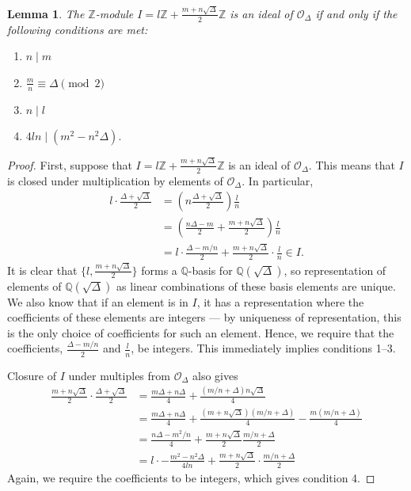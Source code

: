 \documentclass[honours,12pt]{unswthesis}
\newcommand{\Z}{\mathbb{Z}} %
\newcommand{\Q}{\mathbb{Q}} %
\newcommand{\order}{\mathcal{O}} %
\newcommand{\divides}{\mathrel{|}}
\newtheorem{lemma}[theorem]{Lemma}
\numberwithin{equation}{section}
\begin{document}
\vspace{2mm}
\begin{lemma}\label{lemma-lattice-divisibility-conditions}
    The $\Z$-module
    $I = l\Z + \frac{m + n\sqrt\Delta}{2}\Z$
    is an ideal of $\order_\Delta$ if and only if the following conditions are met:
    \begin{enumerate}
        \item $n \divides m$
        \item $\frac{m}{n} \equiv \Delta \pmod{2}$
        \item $n \divides l$
        \item $4ln \divides (m^2 - n^2\Delta).$
    \end{enumerate}
\end{lemma}

\begin{proof}
    First, suppose that $I = l\Z + \frac{m + n\sqrt\Delta}{2} \Z$ is an ideal of $\order_\Delta$.
    This means that $I$ is closed under multiplication by elements of $\order_\Delta$.
    In particular,
    \begin{align*}
        l \cdot \frac{\Delta + \sqrt\Delta}{2} &= \left( n\frac{\Delta + \sqrt\Delta}{2} \right) \frac{l}{n} \\
        &= \left( \frac{n\Delta - m}{2} + \frac{m + n\sqrt\Delta}{2} \right) \frac{l}{n} \\
        &= l \cdot \frac{\Delta - m/n}{2} + \frac{m + n\sqrt\Delta}{2} \cdot \frac{l}{n} \in I.
    \end{align*}
    It is clear that $\{l, \frac{m + n\sqrt\Delta}{2} \}$ forms a $\Q$-basis for $\Q(\sqrt\Delta)$, so representation of elements of $\Q(\sqrt\Delta)$ as linear combinations of these basis elements are unique.
    We also know that if an element is in $I$, it has a representation where the coefficients of these elements are integers --- by uniqueness of representation, this is the only choice of coefficients for such an element.
    Hence, we require that the coefficients, $\frac{\Delta - m/n}{2}$ and $\frac{l}{n}$, be integers.
    This immediately implies conditions 1--3.

    Closure of $I$ under multiples from $\order_\Delta$ also gives
    \begin{align*}
        \frac{m + n\sqrt\Delta}{2} \cdot \frac{\Delta + \sqrt\Delta}{2}
        &= \frac{m\Delta + n\Delta}{4} + \frac{(m/n + \Delta)n\sqrt\Delta}{4} \\
        &= \frac{m\Delta + n\Delta}{4} + \frac{(m + n\sqrt\Delta)(m/n + \Delta)}{4} - \frac{m(m/n + \Delta)}{4} \\
        &= \frac{n\Delta - m^2/n}{4} + \frac{m + n\sqrt\Delta}{2} \frac{m/n + \Delta}{2} \\
        &= l \cdot - \frac{m^2 - n^2\Delta}{4ln} + \frac{m + n\sqrt\Delta}{2} \cdot \frac{m/n + \Delta}{2}
    \end{align*}
    Again, we require the coefficients to be integers, which gives condition 4.


\end{proof}
\end{document}
